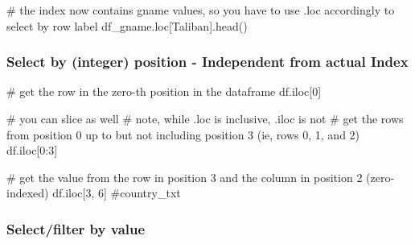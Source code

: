 \documentclass[
  letterpaper,
  DIV=11,
  numbers=noendperiod]{scrreprt}
\newenvironment{Shaded}{\begin{snugshade}}{\end{snugshade}}
\newcommand{\CommentTok}[1]{\textcolor[rgb]{0.37,0.37,0.37}{#1}}
\newcommand{\DecValTok}[1]{\textcolor[rgb]{0.68,0.00,0.00}{#1}}
\newcommand{\NormalTok}[1]{\textcolor[rgb]{0.00,0.23,0.31}{#1}}
\newcommand{\StringTok}[1]{\textcolor[rgb]{0.13,0.47,0.30}{#1}}
\begin{document}
\begin{Shaded}
\begin{Highlighting}[]
\CommentTok{\# the index now contains gname values, so you have to use .loc accordingly to select by row label}
\NormalTok{df\_gname.loc[}\StringTok{\textquotesingle{}Taliban\textquotesingle{}}\NormalTok{].head()}
\end{Highlighting}
\end{Shaded}

\hypertarget{select-by-integer-position---independent-from-actual-index}{%
\subsubsection{Select by (integer) position - Independent from actual
Index}\label{select-by-integer-position---independent-from-actual-index}}

\begin{Shaded}
\begin{Highlighting}[]
\CommentTok{\# get the row in the zero{-}th position in the dataframe}
\NormalTok{df.iloc[}\DecValTok{0}\NormalTok{]}
\end{Highlighting}
\end{Shaded}

\begin{Shaded}
\begin{Highlighting}[]
\CommentTok{\# you can slice as well}
\CommentTok{\# note, while .loc is inclusive, .iloc is not}
\CommentTok{\# get the rows from position 0 up to but not including position 3 (ie, rows 0, 1, and 2)}
\NormalTok{df.iloc[}\DecValTok{0}\NormalTok{:}\DecValTok{3}\NormalTok{]}
\end{Highlighting}
\end{Shaded}

\begin{Shaded}
\begin{Highlighting}[]
\CommentTok{\# get the value from the row in position 3 and the column in position 2 (zero{-}indexed)}
\NormalTok{df.iloc[}\DecValTok{3}\NormalTok{, }\DecValTok{6}\NormalTok{] }\CommentTok{\#country\_txt}
\end{Highlighting}
\end{Shaded}

\hypertarget{selectfilter-by-value}{%
\subsubsection{Select/filter by value}\label{selectfilter-by-value}}
\end{document}
